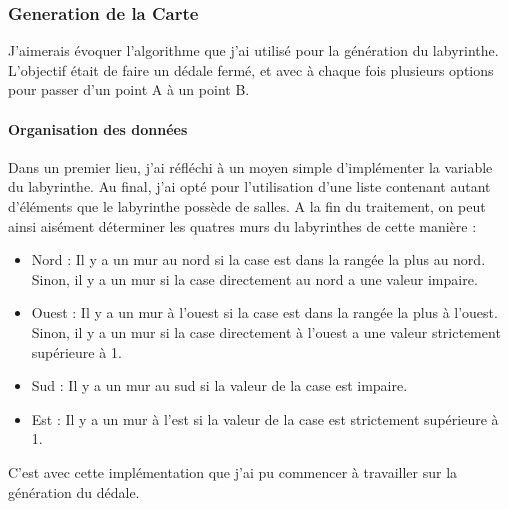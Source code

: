 \documentclass{article}
\begin{document}
\subsubsection{Generation de la Carte}
J'aimerais évoquer l'algorithme que j'ai utilisé pour la génération du labyrinthe. L'objectif était de faire un dédale fermé, et avec à chaque fois plusieurs options pour passer d'un point A à un point B.

\paragraph{Organisation des données}
Dans un premier lieu, j'ai réfléchi à un moyen simple d'implémenter la variable du labyrinthe. Au final, j'ai opté pour l'utilisation d'une liste contenant autant d'éléments que le labyrinthe possède de salles. A la fin du traitement, on peut ainsi aisément déterminer les quatres murs du labyrinthes de cette manière :
\begin{itemize}
\item Nord : Il y a un mur au nord si la case est dans la rangée la plus au nord. Sinon, il y a un mur si la case directement au nord a une valeur impaire.
\item Ouest : Il y a un mur à l'ouest si la case est dans la rangée la plus à l'ouest. Sinon, il y a un mur si la case directement à l'ouest a une valeur strictement supérieure à 1.
\item Sud : Il y a un mur au sud si la valeur de la case est impaire.
\item Est : Il y a un mur à l'est si la valeur de la case est strictement supérieure à 1.
\end{itemize}
C'est avec cette implémentation que j'ai pu commencer à travailler sur la génération du dédale.
\end{document}
